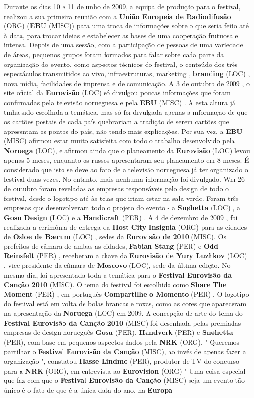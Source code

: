 \documentclass[12pt,a4paper]{article}
\begin{document}
Durante os dias 10 e 11 de unho de 2009, a equipa de produção para o festival, realizou a sua primeira reunião com a \textbf{União Europeia de Radiodifusão} (ORG) (\textbf{EBU} (MISC)) para uma troca de informações sobre o que seria feito até à data, para trocar ideias e estabelecer as bases de uma cooperação frutuosa e intensa. Depois de uma sessão, com a participação de pessoas de uma variedade de áreas, pequenos grupos foram formados para falar sobre cada parte da organização do evento, como aspectos técnicos do festival, o conteúdo dos três espectáculos transmitidos ao vivo, infraestruturas, marketing , \textbf{branding} (LOC) , nova mídia, facilidades de imprensa e de comunicação. A 3 de outubro de 2009 , o site oficial da \textbf{Eurovisão} (LOC) só divulgou poucas informações que foram confirmadas pela televisão norueguesa e pela \textbf{EBU} (MISC) . A esta altura já tinha sido escolhida a temática, mas só foi divulgada apenas a informação de que os cartões postais de cada país quebrariam a tradição de serem cartões que apresentam os pontos do país, não tendo mais explicações. Por sua vez, a \textbf{EBU} (MISC) afirmou estar muito satisfeita com todo o trabalho desenvolvido pela \textbf{Noruega} (LOC), e afirmou ainda que o planeamento da \textbf{Eurovisão} (LOC) levou apenas 5 meses, enquanto os russos apresentaram seu planeamento em 8 meses. É considerado que isto se deve ao fato de a televisão norueguesa já ter organizado o festival duas vezes. No entanto, mais nenhuma informação foi divulgado. Wm 26 de outubro foram reveladas as empresas responsáveis pelo design de todo o festival, desde o logotipo até às telas que iriam estar na sala verde. Foram três empresas que desenvolveram todo o projeto do evento - a \textbf{Snøhetta} (LOC) , a \textbf{Gosu Design} (LOC) e a \textbf{Handicraft} (PER) . A 4 de dezembro de 2009 , foi realizada a cerimônia de entrega da \textbf{Host City Insignia} (ORG) para as cidades de \textbf{Osloe de Bærum} (LOC) , sedes da \textbf{Eurovisão de 2010} (MISC). Os prefeitos de câmara de ambas as cidades, \textbf{Fabian Stang} (PER) e \textbf{Odd Reinsfelt} (PER) , receberam a chave da \textbf{Eurovisão de Yury Luzhkov} (LOC) , vice-presidente da câmara de \textbf{Moscovo} (LOC), sede da última edição. No mesmo dia, foi apresentada toda a temática para o \textbf{Festival Eurovisão da Canção 2010} (MISC). O tema do festival foi escolhido como \textbf{Share The Moment} (PER) , em português \textbf{Compartilhe o Momento} (PER) . O logotipo do festival está em volta de bolas brancas e roxas, como as cores que apareceram na apresentação da \textbf{Noruega} (LOC) em 2009. A concepção de arte do tema do \textbf{Festival Eurovisão da Canção 2010} (MISC) foi desenhada pelas premiadas empresas de design norueguês \textbf{Gosu} (PER), \textbf{Handverk} (PER) e \textbf{Snøhetta} (PER), com base em pequenos aspectos dados pela \textbf{NRK} (ORG). " Queremos partilhar o \textbf{Festival Eurovisão da Canção} (MISC), ao invés de apenas fazer a organização ", constatou \textbf{Hasse Lindmo} (PER), produtor de TV do concurso para a \textbf{NRK} (ORG), em entrevista ao \textbf{Eurovision} (ORG) " Uma coisa especial que faz com que o \textbf{Festival Eurovisão da Canção} (MISC) seja um evento tão único é o fato de que é a única data do ano, na \textbf{Europa} 
\end{document}
